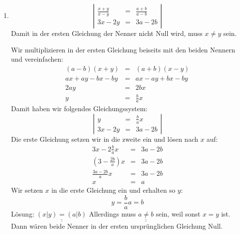 \documentclass[%
11pt,%
twoside,%
titlepage,%
german,%
]{scrartcl}
\newcommand{\result}[1]{\underline{\underline{#1}}}
\begin{document}
\begin{enumerate}
\begin{enumerate}
  \item 
    \begin{displaymath}
      \left| 
        \begin{array}{rcl}
         \frac{x+y}{x-y} & = & \frac{a+b}{a-b} \\
          3x-2y & = & 3a - 2b
        \end{array} \right|
    \end{displaymath}
    Damit in der ersten Gleichung der Nenner nicht Null wird, muss $x\neq y$ sein.

    Wir multiplizieren in der ersten Gleichung beiseits mit den beiden Nennern und vereinfachen:
    \begin{eqnarray*}
      (a-b)(x+y) & = & (a+b)(x-y) \\
      ax+ay-bx-by & = & ax-ay+bx-by \\
      2ay & = & 2bx \\
      y & = & \frac{b}{a}x
    \end{eqnarray*}
    Damit haben wir folgendes Gleichungssystem:
    \begin{displaymath}
      \left| 
        \begin{array}{rcl}
          y & = & \frac{b}{a}x \\
          3x-2y & = & 3a - 2b
        \end{array} \right|
    \end{displaymath}
    Die erste Gleichung setzen wir in die zweite ein und l\"osen nach $x$ auf:
    \begin{eqnarray*}
      3x-2\frac{b}{a}x & = & 3a-2b \\
      \left(3-\frac{2b}{a}\right)x & = & 3a-2b \\
      \frac{3a-2b}{a}x & = & 3a-2b \\
      x & = & a
    \end{eqnarray*}
    Wir setzen $x$ in die erste Gleichung ein und erhalten so $y$:
    \begin{displaymath}
      y = \frac{b}{a}a = b
    \end{displaymath}
    L\"osung: $\result{(x|y)=(a|b)}$ Allerdings muss $\result{a\neq b}$ sein, weil sonst $x=y$ ist. Dann w\"aren beide Nenner in der ersten urspr\"unglichen Gleichung Null.


\end{enumerate}
\end{enumerate}
\end{document}
